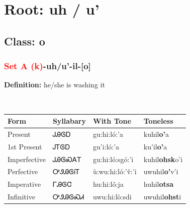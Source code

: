 \needspace{4in}
\section*{Root: uh / u'}
\nopagebreak
{}
\needspace{3in}
\subsection*{Class: o}
\nopagebreak
\needspace{2in}
\subsubsection*{\textcolor{Red}{Set A (k)}{-}\textbf{uh/u'}{-}il{-}[o]}
\nopagebreak
\textbf{Definition: } he/she is washing it
\\[0.5em]
\begin{tabularx}{\textwidth}{l X X X}%
\toprule%
\textbf{Form}&\textbf{Syllabary}&\textbf{With Tone}&\textbf{Toneless}\\%
\midrule%
Present&ᎫᎯᎶᎠ&gu:hi:ló:’a&kuhil\textbf{o'}a\\%
1st Present&ᎫᎢᎶᎠ&gu’i:ló:’a&ku'il\textbf{o'}a\\%
Imperfective&ᎫᎯᎶᏍᎪᎢ&gu:hi:ló:sgó:’i&kuhil\textbf{ohsk}o'i\\%
Perfective&ᎤᏭᎯᎶᎥᎢ&ù:wu:hi:ló:’v̌:’i&uwuhil\textbf{o'}v'i\\%
Imperative&ᎱᎯᎶᏣ&hu:hi:lǒ:ja&huhil\textbf{otsa}\\%
Infinitive&ᎤᏭᎯᎶᏍᏗ&uwu:hi:lò:sdi&uwuhil\textbf{ohst}i\\%
\bottomrule%
\end{tabularx}
\\[1em]